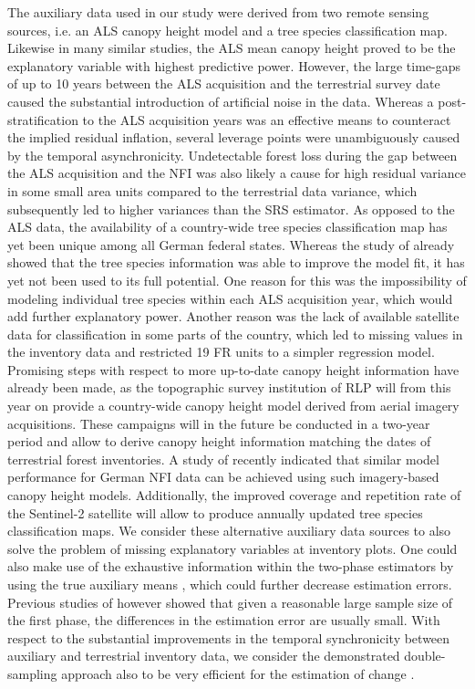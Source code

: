 \documentclass[remotesensing,article,submit,moreauthors,pdftex,10pt,a4paper]{mdpi}
\begin{document}
The auxiliary data used in our study were derived from two remote sensing sources, i.e. an ALS canopy height model and a tree species classification map. Likewise in many similar studies, the ALS mean canopy height proved to be the explanatory variable with highest predictive power. However, the large time-gaps of up to 10 years between the ALS acquisition and the terrestrial survey date caused the substantial introduction of artificial noise in the data. Whereas a post-stratification to the ALS acquisition years was an effective means to counteract the implied residual inflation, several leverage points were unambiguously caused by the temporal asynchronicity. Undetectable forest loss during the gap between the ALS acquisition and the NFI was also likely a cause for high residual variance in some small area units compared to the terrestrial data variance, which subsequently led to higher variances than the SRS estimator. As opposed to the ALS data, the availability of a country-wide tree species classification map has yet been unique among all German federal states. Whereas the study of \citet{hill2017a} already showed that the tree species information was able to improve the model fit, it has yet not been used to its full potential. One reason for this was the impossibility of modeling individual tree species within each ALS acquisition year, which would add further explanatory power. Another reason was the lack of available satellite data for classification in some parts of the country, which led to missing values in the inventory data and restricted 19 FR units to a simpler regression model. Promising steps with respect to more up-to-date canopy height information have already been made, as the topographic survey institution of RLP will from this year on provide a country-wide canopy height model derived from aerial imagery acquisitions. These campaigns will in the future be conducted in a two-year period and allow to derive canopy height information matching the dates of terrestrial forest inventories. A study of \citet{kirchhoefer2017} recently indicated that similar model performance for German NFI data can be achieved using such imagery-based canopy height models. Additionally, the improved coverage and repetition rate of the Sentinel-2 satellite \citep{sentinel2} will allow to produce annually updated tree species classification maps. We consider these alternative auxiliary data sources to also solve the problem of missing explanatory variables at inventory plots. One could also make use of the exhaustive information within the two-phase estimators by using the true auxiliary means \citep{mandallaz2013a, mandallaz2013b}, which could further decrease estimation errors. Previous studies of \citet{mandallaz2013b} however showed that given a reasonable large sample size of the first phase, the differences in the estimation error are usually small. With respect to the substantial improvements in the temporal synchronicity between auxiliary and terrestrial inventory data, we consider the demonstrated double-sampling approach also to be very efficient for the estimation of change \citep{massey2015b}.\par
\end{document}
